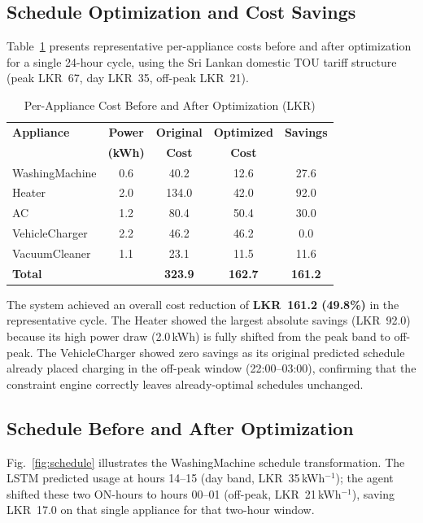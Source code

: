 \documentclass[conference]{IEEEtran}
\begin{document}
\subsection{Schedule Optimization and Cost Savings}

Table~\ref{tab:savings} presents representative per-appliance
costs before and after optimization for a single 24-hour cycle,
using the Sri Lankan domestic TOU tariff structure
(peak LKR~67, day LKR~35, off-peak LKR~21).

\begin{table}[h]
  \centering
  \caption{Per-Appliance Cost Before and After Optimization (LKR)}
  \label{tab:savings}
  \setlength{\tabcolsep}{5pt}
  \begin{tabular}{lcccc}
    \toprule
    \textbf{Appliance} & \textbf{Power} & \textbf{Original} &
    \textbf{Optimized} & \textbf{Savings} \\
                       & \textbf{(kWh)} & \textbf{Cost} & \textbf{Cost} & \\
    \midrule
    WashingMachine  & 0.6 & 40.2  & 12.6  & 27.6 \\
    Heater          & 2.0 & 134.0 & 42.0  & 92.0 \\
    AC              & 1.2 & 80.4  & 50.4  & 30.0 \\
    VehicleCharger  & 2.2 & 46.2  & 46.2  & 0.0  \\
    VacuumCleaner   & 1.1 & 23.1  & 11.5  & 11.6 \\
    \midrule
    \textbf{Total}  &     & \textbf{323.9} & \textbf{162.7} & \textbf{161.2} \\
    \bottomrule
  \end{tabular}
\end{table}

The system achieved an overall cost reduction of
\textbf{LKR~161.2 (49.8\%)} in the representative cycle.
The Heater showed the largest absolute savings (LKR~92.0)
because its high power draw (2.0\,kWh) is fully shifted
from the peak band to off-peak.
The VehicleCharger showed zero savings as its original
predicted schedule already placed charging in the off-peak
window (22:00–03:00), confirming that the constraint engine
correctly leaves already-optimal schedules unchanged.

\subsection{Schedule Before and After Optimization}

Fig.~\ref{fig:schedule} illustrates the WashingMachine schedule
transformation. The LSTM predicted usage at hours 14–15
(day band, LKR~35\,kWh$^{-1}$); the agent shifted these
two ON-hours to hours 00–01 (off-peak, LKR~21\,kWh$^{-1}$),
saving LKR~17.0 on that single appliance for that two-hour window.
\end{document}

